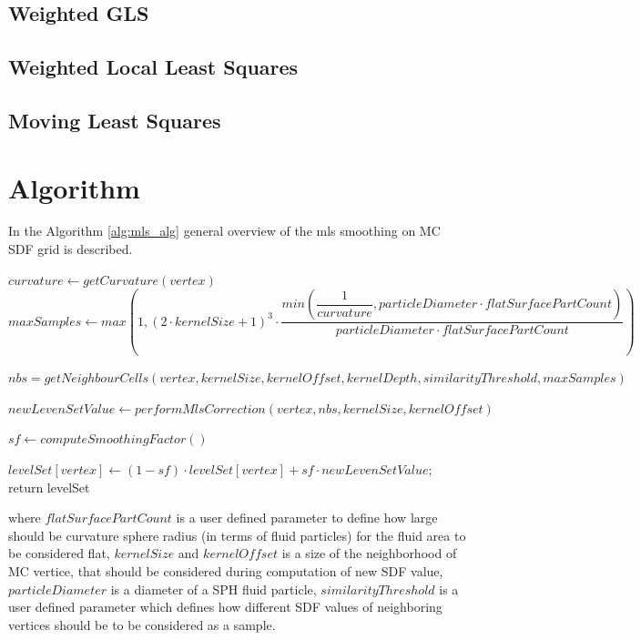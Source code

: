 \subsection{Weighted GLS}
\subsection{Weighted Local Least Squares}
\subsection{Moving Least Squares}

\section{Algorithm}
In the Algorithm \ref{alg:mls_alg} general overview of the mls smoothing on MC SDF grid is described.
\begin{algorithm}[H]
	\scriptsize
	\begin{algorithmic}
			\State $curvature \gets getCurvature(vertex)$
			\State $maxSamples \gets max(1, (2 \cdot kernelSize + 1)^3 \cdot
					\dfrac{min(\dfrac{1}{curvature}, particleDiameter \cdot flatSurfacePartCount)}{particleDiameter \cdot flatSurfacePartCount})$

			\State $nbs = getNeighbourCells(vertex, kernelSize, kernelOffset, kernelDepth, similarityThreshold, maxSamples)$
			
			\State $newLevenSetValue \gets performMlsCorrection(vertex, nbs, kernelSize, kernelOffset)$

			\State $sf\gets computeSmoothingFactor()$

			\State $levelSet[vertex] \gets (1 - sf)\cdot levelSet[vertex] + sf \cdot newLevenSetValue;$
		\EndFor
		return levelSet
	\end{algorithmic}
	\caption{$mlsSurfaceSmooth$}
	\label{alg:mls_alg}
\end{algorithm}
where $flatSurfacePartCount$ is a user defined parameter to define how large should be curvature sphere radius (in terms of fluid particles) for the fluid area to be considered flat, $kernelSize$ and $kernelOffset$ is a size of the neighborhood of MC vertice, that should be considered during computation of new SDF value, $particleDiameter$ is a diameter of a SPH fluid particle, $similarityThreshold$ is a user defined parameter which defines how different SDF values of neighboring vertices should be to be considered as a sample.\\
